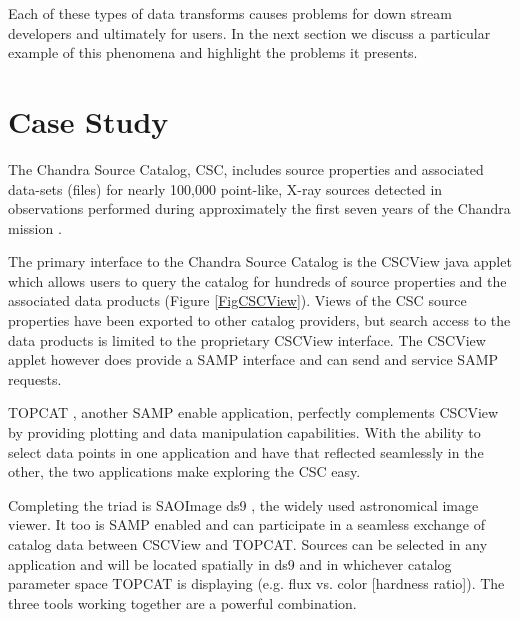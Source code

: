 Each of these types of data transforms causes problems for down stream developers and ultimately for users. In the next section we discuss a particular example of this phenomena and highlight the problems it presents.

\section{Case Study}



The Chandra Source Catalog, CSC,  includes source properties and associated data-sets (files) for nearly 100,000 point-like, X-ray sources detected in observations performed during approximately the first seven years of the Chandra mission \citep{2010ApJS..189...37E}. 


The primary interface to the Chandra Source Catalog is the CSCView java applet \citep{2011ASPC..442..649V} which allows users to query the catalog for hundreds of source properties and the associated  data products (Figure \ref{FigCSCView}). Views of the CSC source properties have been exported to other catalog providers, but search access to the data products is limited to the proprietary CSCView interface.  The CSCView applet however does provide a SAMP \citep{2011arXiv1110.0528T} interface and can send and service SAMP requests.

TOPCAT \citep{2005ASPC..347...29T}, another SAMP enable application, perfectly complements CSCView by providing plotting and data manipulation capabilities.  With the ability to select data points in one application and have that reflected seamlessly in the other, the two applications make exploring the CSC easy.  

Completing the triad is SAOImage ds9 \citep{2003ASPC..295..489J}, the widely used astronomical image viewer. It too is SAMP enabled and can participate in a seamless exchange of catalog data between CSCView and TOPCAT.  Sources can be selected in any application and will be located spatially in ds9 and in whichever catalog parameter space TOPCAT is displaying (e.g. flux vs. color [hardness ratio]). The three tools working together are a powerful combination.  

